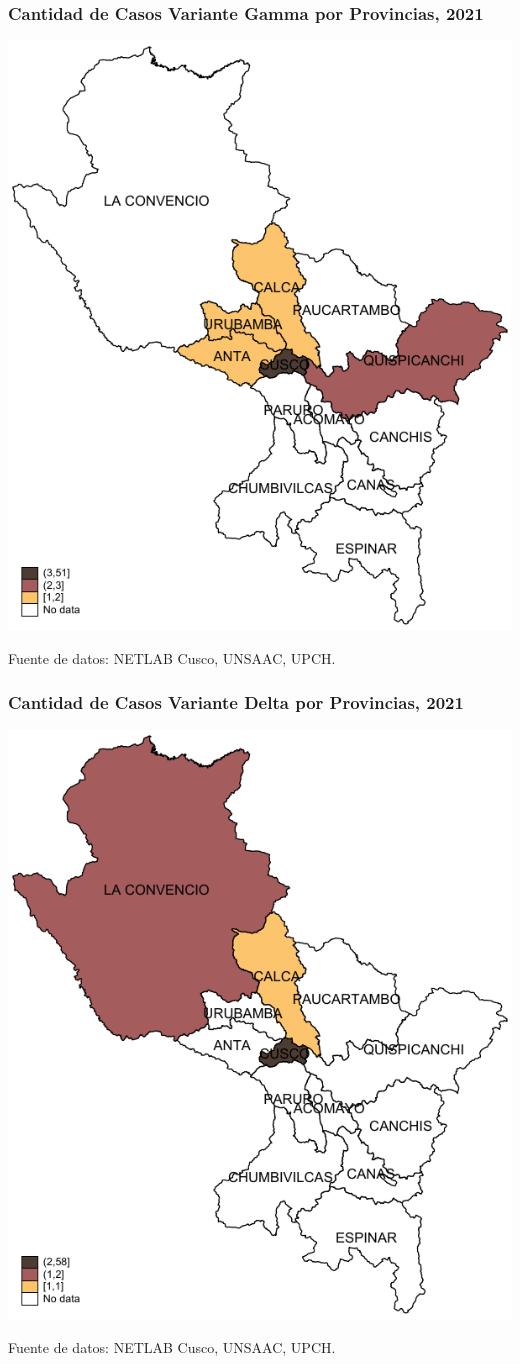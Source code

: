 \documentclass[xcolor=table]{beamer}
\begin{document}
	\begin{frame}[label=mapa_gamma]
		\frametitle{Cantidad de Casos  Variante \textbf{Gamma} por Provincias, 2021}
		\begin{center}
			\includegraphics[width=0.55\linewidth]{../figuras/variantes_provincial_gamma.pdf}
		\end{center}
		{\tiny Fuente de datos: NETLAB Cusco, UNSAAC, UPCH.}
		
		\hyperlink{mapa_variantes}{}
	\end{frame}
	
	\begin{frame}[label=mapa_delta]
		\frametitle{Cantidad de Casos  Variante \textbf{Delta} por Provincias, 2021}
		\begin{center}
			\includegraphics[width=0.55\linewidth]{../figuras/variantes_provincial_delta.pdf}
		\end{center}
		{\tiny Fuente de datos: NETLAB Cusco, UNSAAC, UPCH.}
		
		\hyperlink{mapa_variantes}{}
	\end{frame}
\end{document}
